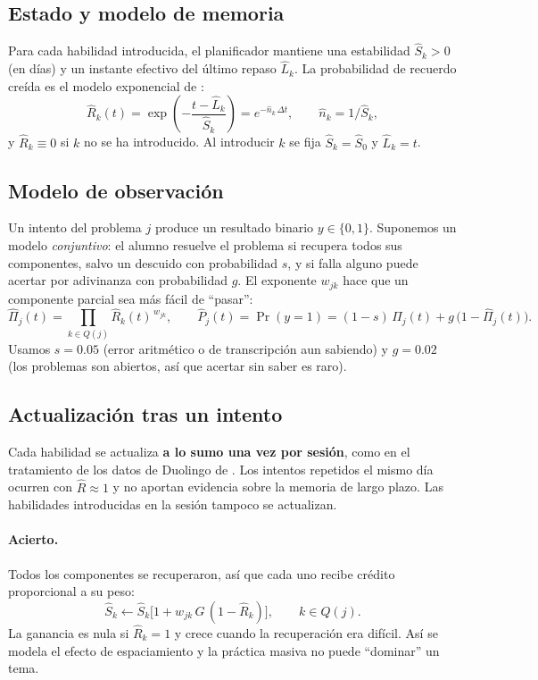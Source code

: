 \documentclass[11pt]{article}
\theoremstyle{definition}
\theoremstyle{remark}
\newcommand{\Rh}{\hat R}
\newcommand{\Sh}{\hat S}
\newcommand{\Lh}{\hat L}
\newcommand{\Pih}{\hat\Pi}
\begin{document}
\subsection{Estado y modelo de memoria}

Para cada habilidad introducida, el planificador mantiene una estabilidad $\Sh_k>0$ (en días) y un instante efectivo del último repaso $\Lh_k$. La probabilidad de recuerdo creída es el modelo exponencial de \citet{tabibian2019}:
\begin{equation}
\Rh_k(t)=\exp\!\left(-\frac{t-\Lh_k}{\Sh_k}\right)=e^{-\hat n_k\,\Delta t},\qquad \hat n_k=1/\Sh_k,
\label{eq:memoria}
\end{equation}
y $\Rh_k\equiv 0$ si $k$ no se ha introducido. Al introducir $k$ se fija $\Sh_k=\Sh_0$ y $\Lh_k=t$.

\subsection{Modelo de observación}

Un intento del problema $j$ produce un resultado binario $y\in\{0,1\}$. Suponemos un modelo \emph{conjuntivo}: el alumno resuelve el problema si recupera todos sus componentes, salvo un descuido con probabilidad $s$, y si falla alguno puede acertar por adivinanza con probabilidad $g$. El exponente $w_{jk}$ hace que un componente parcial sea más fácil de ``pasar'':
\begin{equation}
\Pih_j(t)=\prod_{k\in Q(j)}\Rh_k(t)^{\,w_{jk}},\qquad
\hat P_j(t)=\Pr(y=1)=(1-s)\,\Pih_j(t)+g\,\bigl(1-\Pih_j(t)\bigr).
\label{eq:observacion}
\end{equation}
Usamos $s=0.05$ (error aritmético o de transcripción aun sabiendo) y $g=0.02$ (los problemas son abiertos, así que acertar sin saber es raro).

\subsection{Actualización tras un intento}

Cada habilidad se actualiza \textbf{a lo sumo una vez por sesión}, como en el tratamiento de los datos de Duolingo de \citet{tabibian2019}. Los intentos repetidos el mismo día ocurren con $\Rh\approx1$ y no aportan evidencia sobre la memoria de largo plazo. Las habilidades introducidas en la sesión tampoco se actualizan.

\paragraph{Acierto.} Todos los componentes se recuperaron, así que cada uno recibe crédito proporcional a su peso:
\begin{equation}
\Sh_k\leftarrow \Sh_k\bigl[1+w_{jk}\,G\,(1-\Rh_k)\bigr],\qquad k\in Q(j).
\label{eq:acierto}
\end{equation}
La ganancia es nula si $\Rh_k=1$ y crece cuando la recuperación era difícil. Así se modela el efecto de espaciamiento y la práctica masiva no puede ``dominar'' un tema.
\end{document}
